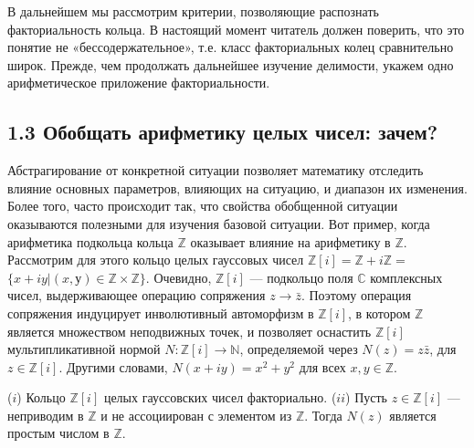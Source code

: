 \documentclass{../../template/mai_book}
\begin{document}
В дальнейшем мы рассмотрим критерии, позволяющие распознать факториальность кольца. В настоящий момент читатель должен пове­рить, что это понятие не «бессодержательное», т.е. класс факториаль­ных колец сравнительно широк. Прежде, чем продолжать дальнейшее изучение делимости, укажем одно арифметическое приложение факториальности.

\newpage

\subsection{\large 1.3 Обобщать арифметику целых чисел: зачем?}

\noindent Абстрагирование от конкретной ситуации позволяет математику отследить влияние основных параметров, влияющих на ситуацию, и диапазон их изменения. Более того, часто происходит так, что свойства обобщенной ситуации оказываются полезными для изучения базовой ситуации. Вот пример, когда арифметика подкольца кольца $\mathds{Z}$ оказывает влияние на арифметику в $\mathds{Z}$.
\newline \indent Рассмотрим для этого кольцо целых гауссовых чисел $\mathds{Z}[i] = \mathds{Z} + i\mathds{Z} =$\newline $\{x + iy | (x, у) \in \mathds{Z} \times \mathds{Z}\}$. Очевидно, $\mathds{Z}[i]$ — подкольцо поля $\mathds{C}$ комплексных чисел, выдерживающее операцию сопряжения $z \rightarrow \bar{z}$. Поэтому операция сопряжения индуцирует инволютивный автоморфизм в $\mathds{Z}[i]$, в котором $\mathds{Z}$ является множеством неподвижных точек, и позволяет оснастить $\mathds{Z}[i]$ мультипликативной нормой $N : \mathds{Z}[i] \rightarrow \mathds{N}$, определяемой через $N(z) = z\bar{z}$, для $z \in \mathds{Z}[i]$. Другими словами, $N(x + iy) = x^2 + y^2 $ для всех $x , y \in \mathds{Z}$.

\begin{predl}
\textit{\indent} ($i$) Кольцо $\mathds{Z}[i]$ целых гауссовских чисел факториально. 
\newline \indent($ii$)  Пусть $z \in \mathds{Z}[i]$ — неприводим в $\mathds{Z}$ и не ассоциирован с элементом из $\mathds{Z}$. Тогда $N(z)$ является простым числом в $\mathds{Z}$.
\end{predl}
\end{document}
